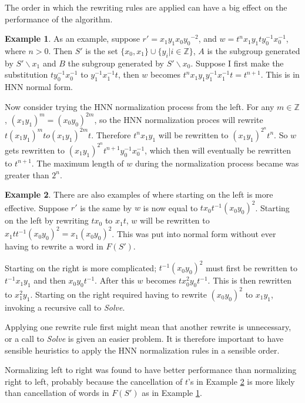 \documentclass[11pt]{article} %
\theoremstyle{definition}
\theoremstyle{definition}
\theoremstyle{definition}
\theoremstyle{definition}
\theoremstyle{definition}
\theoremstyle{definition}
\newtheorem{exmpl}{Example}[theorem]
\begin{document}
The order in which the rewriting rules are applied can have a big effect on the performance
of the algorithm.

\begin{exmpl}\label{ltrbad}
As an example, suppose $r' = {x_1y_1}{x_0y_0}^{-2}$, and
$w = t^n x_1y_1 t y_0^{-1}x_0^{-1}$, where $n > 0$.
Then $S'$ is the set $\{x_0, x_1\} \cup \{y_i | i \in \mathbb{Z}\}$,
$A$ is the subgroup generated by $S' \backslash x_1$ and
$B$ the subgroup generated by $S' \backslash x_0$.
Suppose I first make the substitution $ty_0^{-1}x_0^{-1}$ to $y_1^{-1}x_1^{-1} t$,
then $w$ becomes $t^{n}x_1y_1y_1^{-1}x_1^{-1}t = t^{n+1}$.
This is in HNN normal form.

Now consider trying the HNN normalization process from the left.
For any $m \in \mathbb{Z}$, $(x_1y_1)^m = (x_0y_0)^{2m}$,
so the HNN normalization proces will rewrite $t(x_1y_1)^m to (x_1y_1)^{2m}t$.
Therefore $t^nx_1y_1$ will be rewritten to $(x_1y_1)^{2^n}t^n$.
So $w$ gets rewritten to $(x_1y_1)^{2^n} t^{n+1} y_0^{-1}x_0^{-1}$,
which then will eventually be rewritten to $t^{n+1}$. The maximum length
of $w$ during the normalization process became was greater than $2^n$.
\end{exmpl}

\begin{exmpl}\label{rtlbad}
There are also examples of where starting on the left is more effective.
Suppose $r'$ is the same by $w$ is now equal to
$tx_0t^{-1}(x_0y_0)^2$. Starting on the left by rewriting $t x_0$ to $x_1 t$,
$w$ will be rewritten to $x_1t t^{-1}(x_0y_0)^2 = x_1(x_0y_0)^2$.
This was put into normal form without ever having to rewrite a word in $F(S')$.

Starting on the right is more complicated;
$t^{-1}(x_0y_0)^2$ must first be rewritten
to $t^{-1}x_1y_1$ and then $x_0y_0t^{-1}$.
After this $w$ becomes $tx_0^2 y_0t^{-1}$. This is then
rewritten to $x_1^2 y_1$. Starting on the right required
having to rewrite $(x_0y_0)^2$ to $x_1y_1$, invoking
a recursive call to \textit{Solve}.
\end{exmpl}

Applying one rewrite rule first
might mean that another rewrite is unnecessary, or a call to \textit{Solve} is
given an easier problem. It is therefore important to have sensible heuristics to apply the HNN
normalization rules in a sensible order.

Normalizing left to right was found
to have better performance than normalizing right to left, probably because
the cancellation of $t$'s in Example \ref{rtlbad} is more likely than cancellation
of words in $F(S')$ as in Example \ref{ltrbad}.
\end{document}
